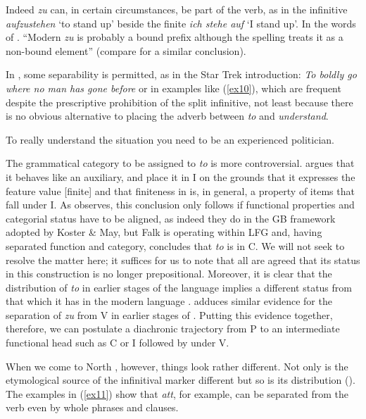 \documentclass[output=paper]{langsci/langscibook}
\begin{document}
Indeed \emph{zu} can, in certain circumstances, be part of the verb, as in the
infinitive \emph{aufzustehen} `to stand up' beside the finite \emph{ich stehe
    auf} `I stand up'. In the words of \cite[296]{Haspelmath89}. \enquote{Modern
     \emph{zu} is probably a bound prefix although the spelling
    treats it as a non-bound element} (compare \citealt{Giusti91} for a similar
    conclusion).

In , some separability is permitted, as in the Star Trek
introduction: \emph{To boldly go where no man has gone before} or in examples
like (\ref{ex10}), which are frequent despite the prescriptive prohibition of
the split infinitive, not least because there is no obvious alternative to
placing the adverb between \emph{to} and \emph{understand}.

\begin{exe}
\ex\label{ex10}
To really understand the situation you need to be an experienced politician.
\end{exe}

The grammatical category to be assigned to  \emph{to} is more
controversial. \cite{Pullum82} argues that it behaves like an auxiliary, and
\cite{KostMay82} place it in I on the grounds that it expresses the feature
value [\textminus{}finite] and that finiteness in  is, in general, a
property of items that fall under I.  As \cite{Falk01to} observes, this
conclusion only follows if functional properties and categorial status have to
be aligned, as indeed they do in the GB framework adopted by Koster \& May, but
Falk is operating within \gls{LFG} and, having
separated function and category, concludes that \emph{to} is in C. We will not
seek to resolve the matter here; it suffices for us to note that all are agreed
that its status in this construction is no longer prepositional. Moreover, it
is clear that the distribution of \emph{to} in earlier stages of the language
implies a different status from that which it has in the modern language
\citep{vanGelderen98}.  \cite{Haspelmath89} adduces similar evidence for the
separation of \emph{zu} from V in earlier stages of . Putting this
evidence together, therefore, we can postulate a diachronic trajectory from P
to an intermediate functional head such as C or I followed by
 under V.

When we come to North , however, things look rather different.
Not only is the etymological source of the infinitival marker different but so
is its distribution (\citealt{Platzack86, BeukDikk89, Christensen07}). The
examples in (\ref{ex11}) show that  \emph{att}, for example, can
be separated from the verb even by whole phrases and clauses.
\end{document}
